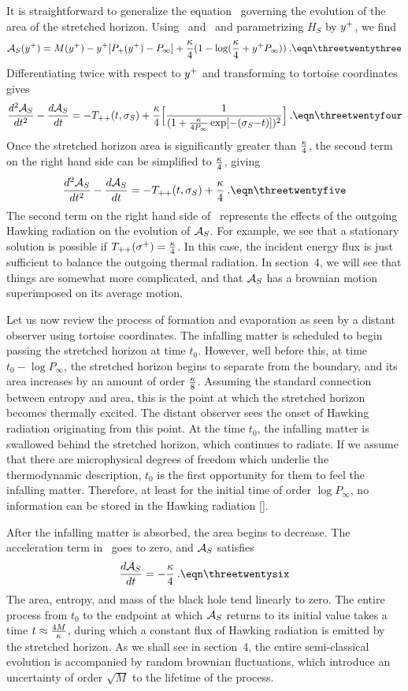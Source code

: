 It is straightforward to generalize the equation \threesix\ governing
the evolution of the area of the stretched horizon.  Using \soli\ and
\hstwo\ and parametrizing $H_S$ by $y^+$, we find
$$
{\cal A}_S(\yp) = M(\yp) - \yp[P_+(\yp)
- P_{\infty}] + {\kappa \over 4} (1 - \log
({\kappa\over 4} + \yp P_{\infty})) \>.
\eqn\threetwentythree
$$
Differentiating twice with respect to $y^+$ and transforming to
tortoise coordinates gives
$$
{d^2 {\cal A}_S \over dt^2} - {d {\cal A}_S \over dt}
= -T_{++}(t,\sigma_S)
+ {\kappa \over 4} \Bigl[ {1 \over (1 + {\kappa
\over 4 P_{\infty}}
\exp [-(\sigma_S{-}t)])^2} \Bigr] \>.
\eqn\threetwentyfour
$$
Once the stretched horizon area is significantly greater than
${\kappa \over 4}$, the second term on the right hand side can be
simplified to ${\kappa \over 4}$, giving
$$
{d^2 {\cal A}_S \over dt^2} - {d {\cal A}_S \over dt}
= -T_{++}(t,\sigma_S)
+ {\kappa \over 4} \>.
\eqn\threetwentyfive
$$
The second term on the right hand side of \threetwentyfive\
represents the effects of the outgoing Hawking radiation on the
evolution of ${\cal A}_S$.  For example, we see that a stationary
solution is possible if $T_{++} (\sigma^+) = {\kappa \over 4}$.  In
this case, the incident energy flux is just sufficient to balance the
outgoing thermal radiation.  In section~4, we will see that things
are somewhat more complicated, and that ${\cal A}_S$ has a brownian
motion superimposed on its average motion.

Let us now review the process of formation and evaporation as seen by
a distant observer using tortoise coordinates.  The infalling matter
is scheduled to begin passing the stretched horizon at time $t_0$.
However, well before this, at time $t_0 - \log P_{\infty}$, the
stretched horizon begins to separate from the boundary, and its area
increases by an amount of order ${\kappa \over 8}$.  Assuming the
standard connection between entropy and area, this is the point at
which the stretched horizon becomes thermally excited.  The distant
observer sees the onset of Hawking radiation originating from this
point.  At the time $t_0$, the infalling matter is swallowed behind
the stretched horizon, which continues to radiate.  If we assume that
there are microphysical degrees of freedom which underlie the
thermodynamic description, $t_0$ is the first opportunity for them to
feel the infalling matter.  Therefore, at least for the initial time
of order $\log P_{\infty}$, no information can be stored in the
Hawking radiation [\svv].

After the infalling matter is absorbed, the area begins to decrease.
The acceleration term in \threetwentyfive\ goes to zero, and ${\cal
A}_S$ satisfies
$$
{d{\cal A}_S \over dt} = -{\kappa \over 4} \>.
\eqn\threetwentysix
$$
The area, entropy, and mass of the black hole tend linearly to zero.
The entire process from $t_0$ to the endpoint at which ${\cal A}_S$
returns to its initial value takes a time $t \approx {4M \over
\kappa}$, during which a constant flux of Hawking radiation is
emitted by the stretched horizon.  As we shall see in section~4, the
entire semi-classical evolution is accompanied by random brownian
fluctuations, which introduce an uncertainty of order $\sqrt{M}$ to
the lifetime of the process.

